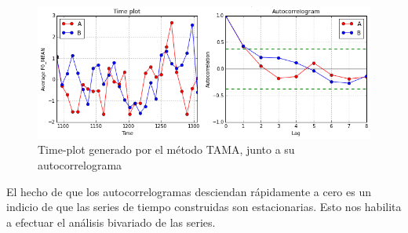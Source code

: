 \begin{figure}
\centering
\includegraphics[width=15cm]{images/time_plot_with_autocorrelation.png}
\caption{Time-plot generado por el método TAMA, junto a su autocorrelograma}
\label{fig:time_plot}
\end{figure}

El hecho de que los autocorrelogramas desciendan rápidamente a cero es un indicio de que las series de tiempo construidas son estacionarias. Esto nos habilita a efectuar el análisis bivariado de las series.
